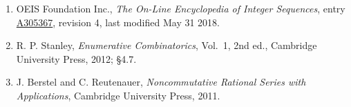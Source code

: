\documentclass[11pt]{article}
\theoremstyle{definition}
\begin{document}
\begin{enumerate}

\item OEIS Foundation Inc., \emph{The On-Line Encyclopedia of Integer Sequences}, entry \href{https://oeis.org/A305367}{A305367}, revision 4, last modified May 31 2018.

\item R. P. Stanley, \emph{Enumerative Combinatorics}, Vol.~1, 2nd ed., Cambridge University Press, 2012; \S4.7.

\item J. Berstel and C. Reutenauer, \emph{Noncommutative Rational Series with Applications}, Cambridge University Press, 2011.

\end{enumerate}
\end{document}
